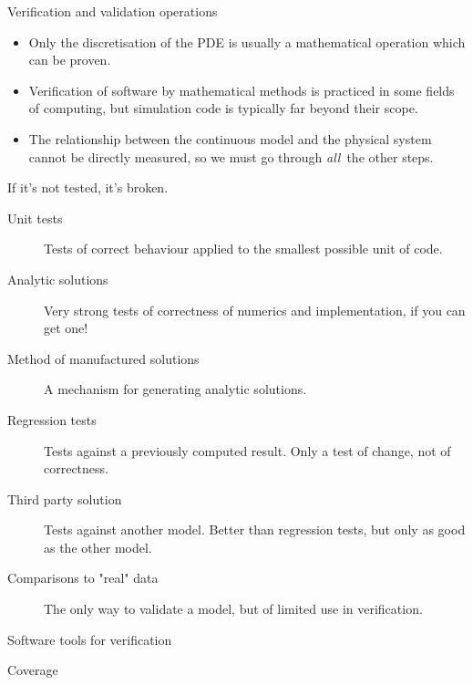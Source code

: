 \documentclass[t]{beamer}
\begin{document}
\begin{frame}{Verification and validation operations}
  
  \begin{itemize}
  \item Only the discretisation of the PDE is usually a mathematical
    operation which can be proven.
  \item Verification of software by mathematical methods is practiced in
    some fields of computing, but simulation code is typically far beyond
    their scope.
  \item The relationship between the continuous model and the physical
    system cannot be directly measured, so we must go through \emph{all}\
    the other steps. 
  \end{itemize}
  
\end{frame}

\begin{frame}{If it's not tested, it's broken.}
  
  \begin{description}
  \item[Unit tests] Tests of correct behaviour applied to the smallest
    possible unit of code.
  \item[Analytic solutions] Very strong tests of correctness of numerics and
    implementation, if you can get one!
  \item[Method of manufactured solutions] A mechanism for generating
    analytic solutions.
  \item[Regression tests] Tests against a previously computed result. Only a
    test of change, not of correctness.
  \item[Third party solution] Tests against another model. Better than
    regression tests, but only as good as the other model.
  \item[Comparisons to "real" data] The only way to validate a model, but of
    limited use in verification.
  \end{description}

\end{frame}

\begin{frame}{Software tools for verification}
  
\end{frame}

\begin{frame}{Coverage}
  
\end{frame}
\end{document}
